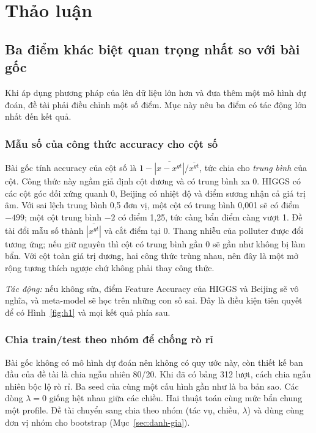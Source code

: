 \section{Thảo luận}
\label{sec:thao-luan}

\subsection{Ba điểm khác biệt quan trọng nhất so với bài gốc}

Khi áp dụng phương pháp của \bbMohRef{} lên dữ liệu lớn hơn và đưa thêm một mô hình dự đoán, đề tài phải điều chỉnh một số điểm. Mục này nêu ba điểm có tác động lớn nhất đến kết quả.

\subsubsection{Mẫu số của công thức accuracy cho cột số}
\label{sec:kb-cong-thuc}
Bài gốc tính accuracy của cột số là $1 - \overline{|x-x^{gt}|}/\overline{x^{gt}}$, tức chia cho \emph{trung bình} của cột. Công thức này ngầm giả định cột dương và có trung bình xa 0. HIGGS có các cột góc đối xứng quanh 0, Beijing có nhiệt độ và điểm sương nhận cả giá trị âm. Với sai lệch trung bình 0,5 đơn vị, một cột có trung bình 0,001 sẽ có điểm $-499$; một cột trung bình $-2$ có điểm 1,25, tức càng bẩn điểm càng vượt 1. Đề tài đổi mẫu số thành $\overline{|x^{gt}|}$ và cắt điểm tại 0. Thang nhiễu của polluter được đổi tương ứng; nếu giữ nguyên thì cột có trung bình gần 0 sẽ gần như không bị làm bẩn. Với cột toàn giá trị dương, hai công thức trùng nhau, nên đây là một mở rộng tương thích ngược chứ không phải thay công thức.

\emph{Tác động:} nếu không sửa, điểm Feature Accuracy của HIGGS và Beijing sẽ vô nghĩa, và meta-model sẽ học trên những con số sai. Đây là điều kiện tiên quyết để có Hình~\ref{fig:h1} và mọi kết quả phía sau.

\subsubsection{Chia train/test theo nhóm để chống rò rỉ}
Bài gốc không có mô hình dự đoán nên không có quy ước này, còn thiết kế ban đầu của đề tài là chia ngẫu nhiên 80/20. Khi đã có bảng 312 lượt, cách chia ngẫu nhiên bộc lộ rò rỉ. Ba seed của cùng một cấu hình gần như là ba bản sao. Các dòng $\lambda = 0$ giống hệt nhau giữa các chiều. Hai thuật toán cùng mức bẩn chung một profile. Đề tài chuyển sang chia theo nhóm (tác vụ, chiều, $\lambda$) và dùng cùng đơn vị nhóm cho bootstrap (Mục~\ref{sec:danh-gia}).


